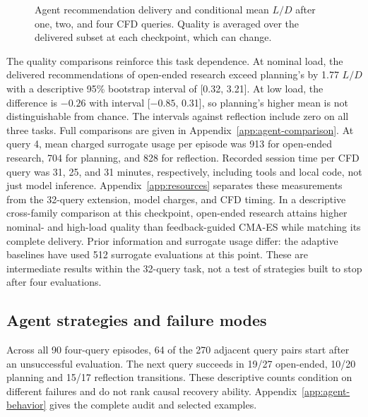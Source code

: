 \documentclass{article} %
\begin{document}
\begin{figure}[t]
\caption{Agent recommendation delivery and conditional mean $L/D$ after one,
two, and four CFD queries. Quality
is averaged over the delivered subset at each checkpoint, which can change.}
\label{fig:agent-recommendations}
\end{figure}

The quality comparisons reinforce this task dependence. At nominal load, the
delivered recommendations of open-ended research exceed planning's by 1.77
$L/D$ with a descriptive 95\% bootstrap interval of [0.32, 3.21]. At low load,
the difference is $-0.26$ with interval [$-0.85$, 0.31], so planning's higher
mean is not distinguishable from chance. The intervals against reflection
include zero on all three tasks. Full comparisons are given in
Appendix~\ref{app:agent-comparison}. At query 4, mean charged surrogate usage
per episode was 913 for open-ended research, 704 for planning, and 828 for
reflection. Recorded session time per CFD query was 31, 25, and 31 minutes,
respectively, including tools and local code, not just model inference.
Appendix~\ref{app:resources} separates these measurements from the 32-query
extension, model charges, and CFD timing. In a descriptive cross-family
comparison at this checkpoint, open-ended research attains
higher nominal- and high-load quality than feedback-guided CMA-ES while
matching its complete delivery. Prior information and surrogate usage differ:
the adaptive baselines have used 512 surrogate evaluations at this point.
These are intermediate results within the
32-query task, not a test of strategies built to stop after four evaluations.

\subsection{Agent strategies and failure modes}

Across all 90 four-query episodes, 64 of the 270 adjacent query pairs start
after an unsuccessful evaluation. The next query succeeds in 19/27 open-ended,
10/20 planning and 15/17 reflection transitions. These descriptive counts
condition on different failures and do not rank causal recovery ability.
Appendix~\ref{app:agent-behavior} gives the complete audit and selected examples.
\end{document}
